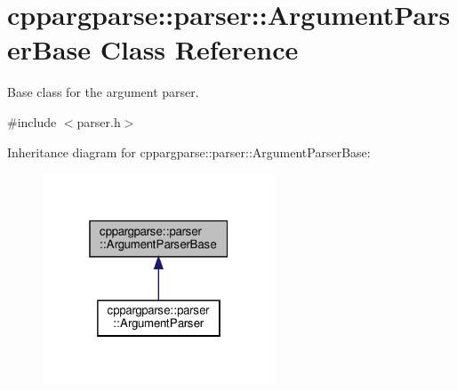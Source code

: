 \hypertarget{classcppargparse_1_1parser_1_1ArgumentParserBase}{}\section{cppargparse\+:\+:parser\+:\+:Argument\+Parser\+Base Class Reference}
\label{classcppargparse_1_1parser_1_1ArgumentParserBase}


Base class for the argument parser.  




{\ttfamily \#include $<$parser.\+h$>$}



Inheritance diagram for cppargparse\+:\+:parser\+:\+:Argument\+Parser\+Base\+:
\nopagebreak
\begin{figure}[H]
\begin{center}
\leavevmode
\includegraphics[width=196pt]{classcppargparse_1_1parser_1_1ArgumentParserBase__inherit__graph}
\end{center}
\end{figure}
